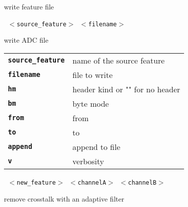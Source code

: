\begin{description}
\begin{description}
        write feature file

       \texttt{ $<$source\_feature$>$ $<$filename$>$      } \

        write ADC file

      \begin{tabular}{ll}
 \texttt{\textbf{source\_feature}} &  name of the source feature \\
 \texttt{\textbf{filename}} &        file to write  \\
 \texttt{\textbf{hm}} &               header kind or "" for no header  \\
 \texttt{\textbf{bm}} &               byte mode  \\
 \texttt{\textbf{from}} &             from  \\
 \texttt{\textbf{to}} &               to  \\
 \texttt{\textbf{append}} &           append to file  \\
 \texttt{\textbf{v}} &                verbosity  \\
      \end{tabular}
       \texttt{ $<$new\_feature$>$ $<$channelA$>$ $<$channelB$>$                } \

        remove crosstalk with an adaptive filter


\end{description}
\end{description}
